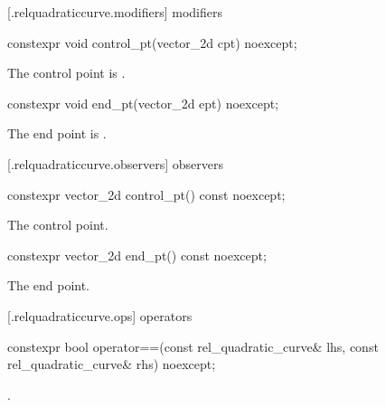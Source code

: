  [\iotwod.relquadraticcurve.modifiers]{ modifiers}

%
\begin{itemdecl}
constexpr void control_pt(vector_2d cpt) noexcept;
\end{itemdecl}
\begin{itemdescr}
\pnum
\effects
The control point is .
\end{itemdescr}

%
\begin{itemdecl}
constexpr void end_pt(vector_2d ept) noexcept;
\end{itemdecl}
\begin{itemdescr}
\pnum
\effects
The end point is .
\end{itemdescr}

 [\iotwod.relquadraticcurve.observers]{ observers}

%
\begin{itemdecl}
constexpr vector_2d control_pt() const noexcept;
\end{itemdecl}
\begin{itemdescr}
\pnum
\returns
The control point.
\end{itemdescr}

%
\begin{itemdecl}
constexpr vector_2d end_pt() const noexcept;
\end{itemdecl}
\begin{itemdescr}
\pnum
\returns
The end point.
\end{itemdescr}

 [\iotwod.relquadraticcurve.ops]{ operators}

%
\begin{itemdecl}
constexpr bool operator==(const rel_quadratic_curve& lhs,
  const rel_quadratic_curve& rhs) noexcept;
\end{itemdecl}
\begin{itemdescr}
\pnum
\returns
{}.
\end{itemdescr}
